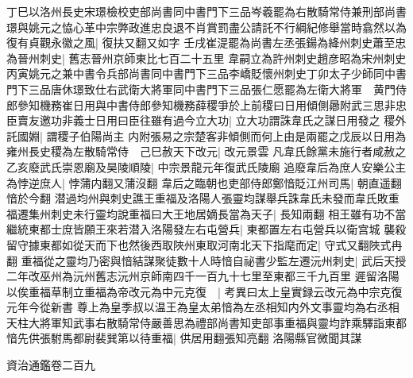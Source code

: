 丁巳以洛州長史宋璟檢校吏部尚書同中書門下三品岑羲罷為右散騎常侍兼刑部尚書璟與姚元之恊心革中宗弊政進忠良退不肖賞罰盡公請託不行綱紀修舉當時翕然以為復有貞觀永徽之風|{
	復扶又翻又如字}
壬戌崔湜罷為尚書左丞張鍚為絳州刺史蕭至忠為晉州刺史|{
	舊志晉州京師東比七百二十五里}
韋嗣立為許州刺史趙彦昭為宋州刺史丙寅姚元之兼中書令兵部尚書同中書門下三品李嶠貶懷州刺史丁卯太子少師同中書門下三品唐休璟致仕右武衛大將軍同中書門下三品張仁愿罷為左衛大將軍　黄門侍郎參知機務崔日用與中書侍郎參知機務薛稷爭於上前稷曰日用傾側曏附武三思非忠臣賣友邀功非義士日用曰臣往雖有過今立大功|{
	立大功謂誅韋氏之謀日用發之}
稷外託國婣|{
	謂稷子伯陽尚主}
内附張易之宗楚客非傾側而何上由是兩罷之戊辰以日用為雍州長史稷為左散騎常侍　己巳赦天下改元|{
	改元景雲}
凡韋氏餘黨未施行者咸赦之　乙亥廢武氏崇恩廟及昊陵順陵|{
	中宗景龍元年復武氏陵廟}
追廢韋后為庶人安樂公主為悖逆庶人|{
	悖蒲内翻又蒲沒翻}
韋后之臨朝也吏部侍郎鄭愔貶江州司馬|{
	朝直遥翻愔於今翻}
潜過均州與刺史譙王重福及洛陽人張靈均謀舉兵誅韋氏未發而韋氏敗重福遷集州刺史未行靈均說重福曰大王地居嫡長當為天子|{
	長知兩翻}
相王雖有功不當繼統東都士庶皆願王來若潜入洛陽發左右屯營兵|{
	東都置左右屯營兵以衛宫城}
襲殺留守據東都如從天而下也然後西取陜州東取河南北天下指麾而定|{
	守式又翻陜式冉翻}
重福從之靈均乃密與愔結謀聚徒數十人時愔自祕書少監左遷沅州刺史|{
	武后天授二年改巫州為沅州舊志沅州京師南四千一百九十七里至東都三千九百里}
遲留洛陽以俟重福草制立重福為帝改元為中元克復　|{
	考異曰太上皇實録云改元為中宗克復元年今從新書}
尊上為皇季叔以温王為皇太弟愔為左丞相知内外文事靈均為右丞相天柱大將軍知武事右散騎常侍嚴善思為禮部尚書知吏部事重福與靈均詐乘驛詣東都愔先供張駙馬都尉裴巽第以待重福|{
	供居用翻張知亮翻}
洛陽縣官微聞其謀

資治通鑑卷二百九
